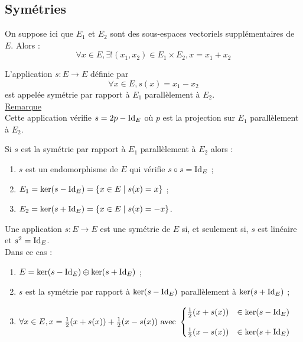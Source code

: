 \subsection{Symétries}
    On suppose ici que \(E_1\) et \(E_2\) sont des sous-espaces vectoriels supplémentaires de \(E\). Alors :
    \[\forall x \in  E, \exists!(x_1, x_2) \in  E_1 \times E_2, x = x_1 + x_2\]
\begin{defi}
    L’application \(s : E \to E\) définie par
    \[\forall x \in  E, s(x) = x_1 - x_2\]
    est appelée symétrie par rapport à \(E_1\) parallèlement à \(E_2\).\\
    \underline{Remarque}\\
    Cette application vérifie \(s = 2p - \mathrm{Id}_{E}\) où \(p\) est la projection sur \(E_1\) parallèlement à \(E_2\).
\end{defi}

\begin{prop}
    Si \(s\) est la symétrie par rapport à \(E_1\) parallèlement à \(E_2\) alors :
    \begin{enumerate}
        \item \(s\) est un endomorphisme de \(E\) qui vérifie \(s \circ s = \mathrm{Id}_{E}\) ;
        \item \(E_1 = \ker (s - \mathrm{Id}_{E} ) = \left\lbrace x \in  E \;\middle|\; s(x) = x\right\rbrace\) ;
        \item \(E_2 = \ker (s + \mathrm{Id}_{E} ) = \left\lbrace x \in  E \;\middle|\; s(x) = -x\right\rbrace\).
    \end{enumerate}
\end{prop}

\begin{defprop}
    Une application \(s : E \to E\) est une symétrie de \(E\) si, et seulement si, \(s\) est linéaire et \(s^2 = \mathrm{Id}_{E}\).\\
    Dans ce cas :
    \begin{enumerate}
        \item \(E = \ker (s - \mathrm{Id}_{E} ) \oplus \ker (s + \mathrm{Id}_{E} )\) ;
        \item \(s\) est la symétrie par rapport à \(\ker (s - \mathrm{Id}_{E} )\) parallèlement à \(\ker (s + \mathrm{Id}_{E} )\) ;
        \item \(\forall x \in  E, x = \frac{1}{2} (x + s(x)) + \frac{1}{2} (x - s(x))\text{ avec }\begin{cases}
        \frac{1}{2} (x + s(x)) &\in  \ker (s - \mathrm{Id}_{E} )\\[10pt]
        \frac{1}{2} (x - s(x)) &\in  \ker (s + \mathrm{Id}_{E} )
        \end{cases}\)
    \end{enumerate}
\end{defprop}

